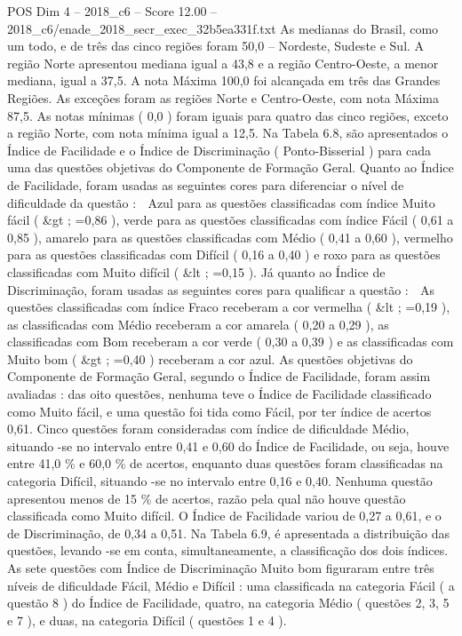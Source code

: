 \begin{textsample}{POS Dim 4 – 2018\_c6 – Score 12.00 – 2018\_c6/enade\_2018\_secr\_exec\_32b5ea331f.txt}
As medianas do Brasil, como um todo, e de três das cinco regiões foram 50,0 – Nordeste, Sudeste e Sul.
A região Norte apresentou mediana igual a 43,8 e a região Centro-Oeste, a menor mediana, igual a 37,5.
A nota Máxima 100,0 foi alcançada em três das Grandes Regiões.
As exceções foram as regiões Norte e Centro-Oeste, com nota Máxima 87,5.
As notas mínimas ( 0,0 ) foram iguais para quatro das cinco regiões, exceto a região Norte, com nota mínima igual a 12,5.
Na Tabela 6.8, são apresentados o Índice de Facilidade e o Índice de Discriminação ( Ponto-Bisserial ) para cada uma das questões objetivas do Componente de Formação Geral.
Quanto ao Índice de Facilidade, foram usadas as seguintes cores para diferenciar o nível de dificuldade da questão :  Azul para as questões classificadas com índice Muito fácil ( \&gt ; =0,86 ), verde para as questões classificadas com índice Fácil ( 0,61 a 0,85 ), amarelo para as questões classificadas com Médio ( 0,41 a 0,60 ), vermelho para as questões classificadas com Difícil ( 0,16 a 0,40 ) e roxo para as questões classificadas com Muito difícil ( \&lt ; =0,15 ).
Já quanto ao Índice de Discriminação, foram usadas as seguintes cores para qualificar a questão :  As questões classificadas com índice Fraco receberam a cor vermelha ( \&lt ; =0,19 ), as classificadas com Médio receberam a cor amarela ( 0,20 a 0,29 ), as classificadas com Bom receberam a cor verde ( 0,30 a 0,39 ) e as classificadas com Muito bom ( \&gt ; =0,40 ) receberam a cor azul.
As questões objetivas do Componente de Formação Geral, segundo o Índice de Facilidade, foram assim avaliadas : das oito questões, nenhuma teve o Índice de Facilidade classificado como Muito fácil, e uma questão foi tida como Fácil, por ter índice de acertos 0,61.
Cinco questões foram consideradas com índice de dificuldade Médio, situando -se no intervalo entre 0,41 e 0,60 do Índice de Facilidade, ou seja, houve entre 41,0 \% e 60,0 \% de acertos, enquanto duas questões foram classificadas na categoria Difícil, situando -se no intervalo entre 0,16 e 0,40.
Nenhuma questão apresentou menos de 15 \% de acertos, razão pela qual não houve questão classificada como Muito difícil.
O Índice de Facilidade variou de 0,27 a 0,61, e o de Discriminação, de 0,34 a 0,51.
Na Tabela 6.9, é apresentada a distribuição das questões, levando -se em conta, simultaneamente, a classificação dos dois índices.
As sete questões com Índice de Discriminação Muito bom figuraram entre três níveis de dificuldade Fácil, Médio e Difícil : uma classificada na categoria Fácil ( a questão 8 ) do Índice de Facilidade, quatro, na categoria Médio ( questões 2, 3, 5 e 7 ), e duas, na categoria Difícil ( questões 1 e 4 ).

\end{textsample}
